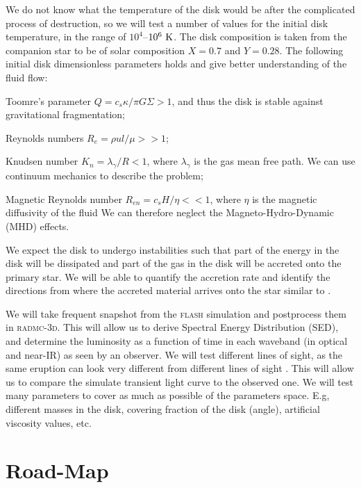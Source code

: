 \documentclass[modern]{aastex62}
\newcommand{\flash}[1]{\textsc{flash}#1}
\newcommand{\radmc}[1]{\textsc{radmc-3d}#1}
\def \K{~\rm{K}}
\begin{document}
We do not know what the temperature of the disk would be after the complicated process of destruction, so we will test a number of values for the initial disk temperature, in the range of $10^4$--$10^6 \K$.
The disk composition is taken from the companion star to be of solar composition $X=0.7$ and $Y=0.28$.
The following initial disk dimensionless parameters holds and give better understanding of the fluid flow: 
\begin{enumerate*}[label={(\alph*)}]
\item Toomre’s parameter \citep{1964ApJ...139.1217T} $Q=c_s\kappa/\pi G \Sigma > 1$, and thus the disk is stable against gravitational fragmentation;
\item Reynolds numbers $R_e=\rho u l / \mu>>1$;
\item Knudsen number $K_n=\lambda_\gamma / R < 1$, where $\lambda_\gamma$ is the gas mean free path.  We can use continuum mechanics to describe the problem;
\item Magnetic Reynolds number $R_{en}= c_s H/ \eta <<1$, where $\eta$ is the magnetic diffusivity of the fluid We can therefore neglect the Magneto-Hydro-Dynamic (MHD) effects.
\end{enumerate*}

We expect the disk to undergo instabilities \citep{1988MNRAS.232....1F,2018ASSL..454.....S}
such that part of the energy in the disk will be dissipated and part of the gas in the disk will be accreted onto the primary star.
We will be able to quantify the accretion rate and identify the directions from where the accreted material arrives onto the star similar to \cite{2018arXiv180502529K,2018Galax...6...82K}.

We will take frequent snapshot from the \flash{} simulation and postprocess them in \radmc{}.
This will allow us to derive Spectral Energy Distribution (SED), and determine the luminosity as a function of time in each waveband (in optical and near-IR) as seen by an observer.
We will test different lines of sight, as the same eruption can look very different from different lines of sight \cite{2017MNRAS.467.3299K}.
This will allow us to compare the simulate transient light curve to the observed one.
We will test many parameters to cover as much as possible of the parameters space. E.g, different masses in the disk, covering fraction of the disk (angle), artificial viscosity values, etc.

\section{Road-Map}
\end{document}
